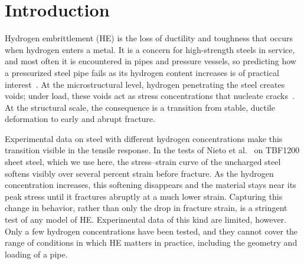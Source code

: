 \documentclass[pdflatex,sn-mathphys-num]{sn-jnl}%
\theoremstyle{thmstyleone}%
\theoremstyle{thmstyletwo}%
\theoremstyle{thmstylethree}%
\begin{document}


\maketitle

\section{Introduction}\label{sec1}

Hydrogen embrittlement (HE) is the loss of ductility and toughness that occurs when hydrogen enters a metal. It is a concern for high-strength steels in service, and most often it is encountered in pipes and pressure vessels, so predicting how a pressurized steel pipe fails as its hydrogen content increases is of practical interest~\cite{chowdhury2025review}. At the microstructural level, hydrogen penetrating the steel creates voids; under load, these voids act as stress concentrations that nucleate cracks~\cite{robertson2015hydrogen}. At the structural scale, the consequence is a transition from stable, ductile deformation to early and abrupt fracture.

Experimental data on steel with different hydrogen concentrations make this transition visible in the tensile response. In the tests of Nieto et al.~\cite{nieto2024thesis} on TBF1200 sheet steel, which we use here, the stress--strain curve of the uncharged steel softens visibly over several percent strain before fracture. As the hydrogen concentration increases, this softening disappears and the material stays near its peak stress until it fractures abruptly at a much lower strain. Capturing this change in behavior, rather than only the drop in fracture strain, is a stringent test of any model of HE. Experimental data of this kind are limited, however. Only a few hydrogen concentrations have been tested, and they cannot cover the range of conditions in which HE matters in practice, including the geometry and loading of a pipe.
\end{document}

